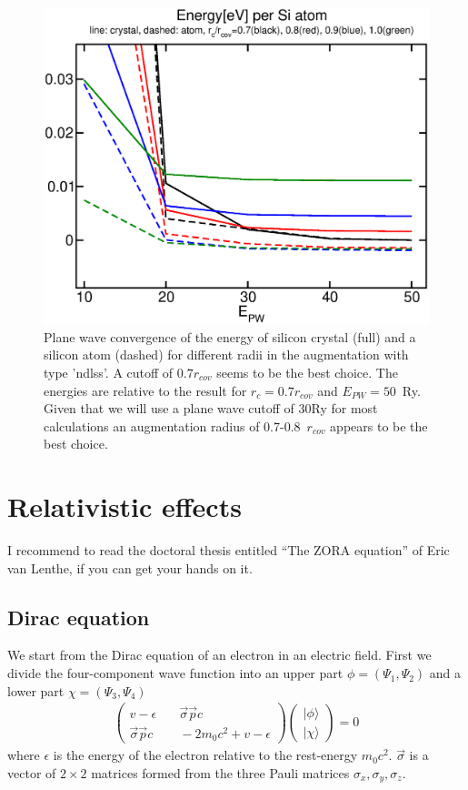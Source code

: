\documentclass[11pt,a4paper]{report}
\begin{document}
\begin{figure}[h!]
\begin{center}
\includegraphics[width=0.5\linewidth]
{Figs/Siepwconvndlessrad/etotofepwofrcl.eps}
\end{center}
\caption{\label{fig:epwconvsindlss} Plane wave convergence of the
  energy of silicon crystal (full) and a silicon atom (dashed) for
  different radii in the augmentation with type 'ndlss'. A cutoff of
  $0.7 r_{cov}$ seems to be the best choice. The energies are relative
  to the result for $r_c=0.7 r_{cov}$ and $E_{PW}=50$~Ry. Given that
  we will use a plane wave cutoff of 30Ry for most calculations an
  augmentation radius of 0.7-0.8~$r_{cov}$ appears to be the best choice.}
\end{figure}


\section{Relativistic effects}
I recommend to read the doctoral thesis entitled ``The ZORA equation''
of Eric van Lenthe\cite{lenthe96_thesis}, if you can get your hands on
it.


\subsection{Dirac equation}
We start from the Dirac equation of an electron in an electric field.
First we divide the four-component wave function into an upper part
$\phi=(\Psi_1,\Psi_2)$ and a lower part $\chi=(\Psi_3,\Psi_4)$
\begin{eqnarray}
\left(\begin{array}{cc}
v-\epsilon &\quad \vec{\sigma}\vec{p}c\\
\vec{\sigma}\vec{p}c &\quad -2m_0c^2+v-\epsilon\end{array}\right)
\left(\begin{array}{c}|\phi\rangle\\|\chi\rangle\end{array}\right)=0
\label{eq:dirac2by2withepsilon}
\end{eqnarray}
where $\epsilon$ is the energy of the electron relative to the
rest-energy $m_0c^2$. $\vec{\sigma}$ is a vector of $2\times2$
matrices formed from the three Pauli matrices
$\sigma_x,\sigma_y,\sigma_z$.
\end{document}
